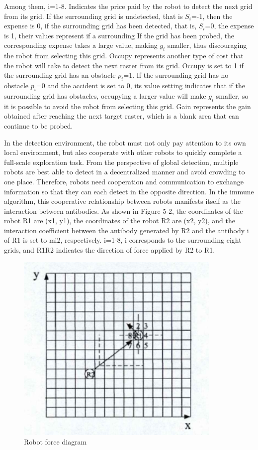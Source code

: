\documentclass[Proceedings]{ascelike}
\begin{document}
\par
Among them, i=1-8. Indicates the price paid by the robot to detect the next grid from its grid. If the surrounding grid is undetected, that is \boldmath$S_{i}$=-1, then the expense is 0, if the surrounding grid has been detected, that is, \boldmath$S_{i}$=0, the expense is 1, their values represent if a surrounding If the grid has been probed, the corresponding expense takes a large value, making \boldmath$g_{i}$ smaller, thus discouraging the robot from selecting this grid. Occupy represents another type of cost that the robot will take to detect the next raster from its grid. Occupy is set to 1 if the surrounding grid has an obstacle \boldmath$p_{i}$=1. If the surrounding grid has no obstacle \boldmath$p_{i}$=0 and the accident is set to 0, its value setting indicates that if the surrounding grid has obstacles, occupying a larger value will make \boldmath$g_{i}$ smaller, so it is possible to avoid the robot from selecting this grid. Gain represents the gain obtained after reaching the next target raster, which is a blank area that can continue to be probed.
\par
In the detection environment, the robot must not only pay attention to its own local environment, but also cooperate with other robots to quickly complete a full-scale exploration task. From the perspective of global detection, multiple robots are best able to detect in a decentralized manner and avoid crowding to one place. Therefore, robots need cooperation and communication to exchange information so that they can each detect in the opposite direction. In the immune algorithm, this cooperative relationship between robots manifests itself as the interaction between antibodies. As shown in Figure 5-2, the coordinates of the robot R1 are (x1, y1), the coordinates of the robot R2 are (x2, y2), and the interaction coefficient between the antibody generated by R2 and the antibody i of R1 is set to mi2, respectively. i=1-8, i corresponds to the surrounding eight grids, and R1R2 indicates the direction of force applied by R2 to R1.
\begin{figure}
\centering
    \includegraphics[scale=0.6] {img/immune_network_force_diagram.png}
    \caption{Robot force diagram}
\end{figure}
\end{document}
